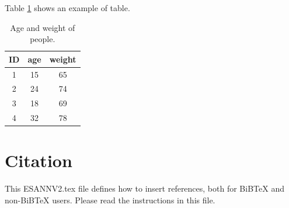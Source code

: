 \documentclass{esannV2}
\begin{document}
Table \ref{Tab:AgeWeight} shows an example of table.

\begin{table}[h!]
  \centering
  \begin{tabular}{|c|c|c|}
    \hline
    ID & age & weight \\
    \hline
    1& 15 & 65 \\
    2& 24 & 74\\
    3& 18 & 69 \\
    4& 32 & 78 \\
    \hline
  \end{tabular}
  \caption{Age and weight of people.}\label{Tab:AgeWeight}
\end{table}

\section{Citation}
This ESANNV2.tex file defines how to insert references, both for
BiBTeX and non-BiBTeX users.  Please read the instructions in this
file.

\end{document}
